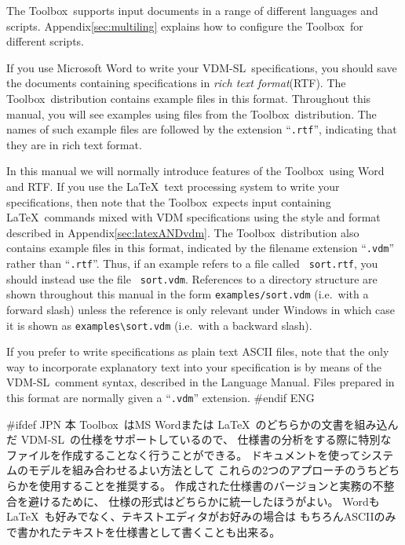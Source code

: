 \documentclass[\pformat,12pt]{article}
\newcommand{\vdmslpp}{VDM-SL}
\newcommand{\Toolbox}{Toolbox}
\newcommand{\vdmext}{vdm}
\newcommand{\vdmslpp}{VDM++}
\newcommand{\Toolbox}{Toolbox}
\newcommand{\vdmext}{vpp}
\begin{document}
The \Toolbox\ supports input documents in a range of different
languages and scripts. 
Appendix\ref{sec:multiling} explains how to 
configure the \Toolbox\ for different scripts. 

If you use Microsoft Word to write your \vdmslpp\ specifications, you
should save the documents containing specifications in {\em rich text
  format\/}(RTF). The \Toolbox\ distribution contains example files in
this format. Throughout this manual, you will see examples using files
from the \Toolbox\ distribution. The names of such example files are
followed by the extension ``{\tt .rtf}'', indicating that they are in
rich text format. 

In this manual we will normally introduce features of the \Toolbox\ 
using Word and RTF.  If you use the \LaTeX\ text processing system to
write your specifications, then note that the \Toolbox\ expects input
containing \LaTeX\ commands mixed with VDM specifications using the
style and format described in Appendix\ref{sec:latexANDvdm}. The
\Toolbox\ distribution also contains example files in this format,
indicated by the filename extension ``{\tt .\vdmext}'' rather than
``{\tt .rtf}''.  Thus, if an example refers to a file called {\tt
  sort.rtf}, you should instead use the file {\tt
  sort.\vdmext}. References to a directory structure are shown
throughout this manual in the form {\tt examples/sort.vdm} (i.e.\ with a
forward slash)   unless the reference is only relevant under Windows
in which case  it is shown as \verb+examples\sort.vdm+ (i.e.\ with a
backward slash).

If you prefer to write specifications as plain text ASCII files, 
note that the only way to incorporate explanatory text into your
specification is by means of the \vdmslpp\ comment syntax, described
in the Language Manual. Files prepared in this format are normally
given a ``{\tt .\vdmext}'' extension.
#endif ENG

#ifdef JPN
本 \Toolbox\ はMS Wordまたは \LaTeX\ のどちらかの文書を組み込んだ \vdmslpp\ の仕様をサポートしているので、
仕様書の分析をする際に特別なファイルを作成することなく行うことができる。
ドキュメントを使ってシステムのモデルを組み合わせるよい方法として
これらの2つのアプローチのうちどちらかを使用することを推奨する。
作成された仕様書のバージョンと実務の不整合を避けるために、
仕様の形式はどちらかに統一したほうがよい。
Wordも \LaTeX\ も好みでなく、テキストエディタがお好みの場合は
もちろんASCIIのみで書かれたテキストを仕様書として書くことも出来る。
\end{document}
